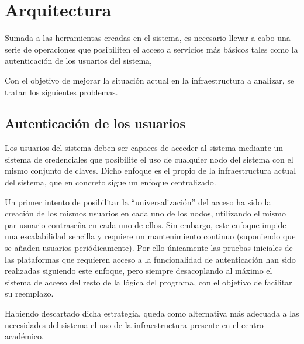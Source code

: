 \chapter{Arquitectura}

Sumada a las herramientas creadas en el sistema, es necesario llevar a cabo una serie de operaciones que posibiliten el acceso a servicios más básicos tales como la autenticación de los usuarios del sistema, %

Con el objetivo de mejorar la situación actual en la infraestructura a analizar, se tratan los siguientes problemas.

\section{Autenticación de los usuarios}

Los usuarios del sistema deben ser capaces de acceder al sistema mediante un sistema de credenciales que posibilite el uso de cualquier nodo del sistema con el mismo conjunto de claves. Dicho enfoque es el propio de la infraestructura actual del sistema, que en concreto sigue un enfoque centralizado.

Un primer intento de posibilitar la ``universalización'' del acceso ha sido la creación de los mismos usuarios en cada uno de los nodos, utilizando el mismo par usuario-contraseña en cada uno de ellos. Sin embargo, este enfoque impide una escalabilidad sencilla y requiere un mantenimiento continuo (suponiendo que se añaden usuarios periódicamente). Por ello únicamente las pruebas iniciales de las plataformas que requieren acceso a la funcionalidad de autenticación han sido realizadas siguiendo este enfoque, pero siempre desacoplando al máximo el sistema de acceso del resto de la lógica del programa, con el objetivo de facilitar su reemplazo.

Habiendo descartado dicha estrategia, queda como alternativa más adecuada a las necesidades del sistema el uso de la infraestructura presente en el centro académico.

